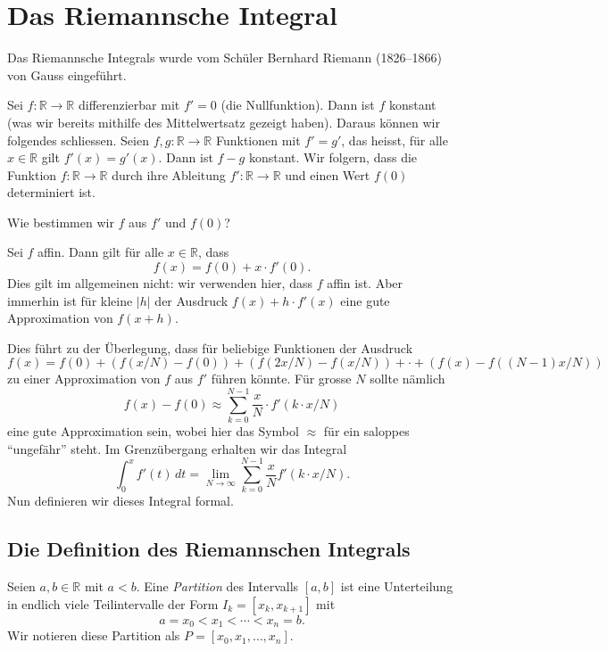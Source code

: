 \documentclass[../main.tex]{subfiles}
\begin{document}
\chapter{Das Riemannsche Integral}
Das Riemannsche Integrals wurde
vom Schüler Bernhard Riemann (1826--1866)
von Gauss eingeführt.

Sei $f \colon \mathbb{R} \to \mathbb{R}$ differenzierbar
mit $f' = 0$ (die Nullfunktion).
Dann ist $f$ konstant (was wir bereits mithilfe des
Mittelwertsatz gezeigt haben). Daraus können wir
folgendes schliessen.
Seien $f, g \colon \mathbb{R} \to \mathbb{R}$ 
Funktionen mit
$f' = g'$, das heisst, für alle $x \in \mathbb{R}$
gilt $f'(x) = g'(x)$.
Dann ist $f - g$ konstant.
Wir folgern, dass die Funktion $f \colon \mathbb{R} \to \mathbb{R}$ 
durch ihre Ableitung $f' \colon \mathbb{R} \to \mathbb{R}$ 
und einen Wert $f(0)$ determiniert ist.

\begin{question}
  Wie bestimmen wir $f$ aus $f'$ 
  und $f(0)$?
\end{question}

\begin{specialcase}
  Sei $f$ affin. Dann gilt für alle
  $x \in \mathbb{R}$, dass
  \[
    f(x) = f(0) + x \cdot f'(0).
  \]
  Dies gilt im allgemeinen nicht: wir verwenden
  hier, dass $f$ affin ist.
  Aber immerhin ist für kleine $|h|$
  der Ausdruck $f(x) + h \cdot f'(x)$ eine
  gute Approximation von $f(x + h)$.
\end{specialcase}

Dies führt zu der Überlegung, dass für beliebige
Funktionen der Ausdruck
\[
  f(x) = f(0) + (f(x/N) - f(0))
  + (f(2x/N) - f(x/N)) + \cdot
  + (f(x) - f((N-1)x/N))
\]
zu einer Approximation von $f$ aus
$f'$ führen könnte. Für grosse $N$ 
sollte nämlich
\[
  f(x) - f(0) \approx \sum_{k = 0}^{N - 1} 
  \frac{x}{N} \cdot f'(k \cdot x / N)
\]
eine gute Approximation sein, wobei
hier das Symbol $\approx$ für ein
saloppes ``ungefähr'' steht.
Im Grenzübergang erhalten wir das
Integral
\[
  \int_{0}^{x} f'(t) \, dt =
  \lim_{N \to \infty} \sum_{k = 0}^{N - 1} \frac{x}{N}
  f'(k \cdot x/N).
\]
Nun definieren wir dieses Integral formal.

\section{Die Definition des Riemannschen Integrals}\label{sec:riemann-definition}
\begin{definition}
  Seien $a,b \in \mathbb{R}$
  mit $a < b$. Eine \emph{Partition} des Intervalls
  $[a, b]$ ist eine Unterteilung in
  endlich viele Teilintervalle der
  Form
  $I_k = [x_k, x_{k  + 1}]$ mit
  \[
    a = x_0 < x_1 < \cdots < x_n = b.
  \]
  Wir notieren diese Partition als
  $P = [x_0, x_1, \dots, x_n]$.
\end{definition}
\end{document}
